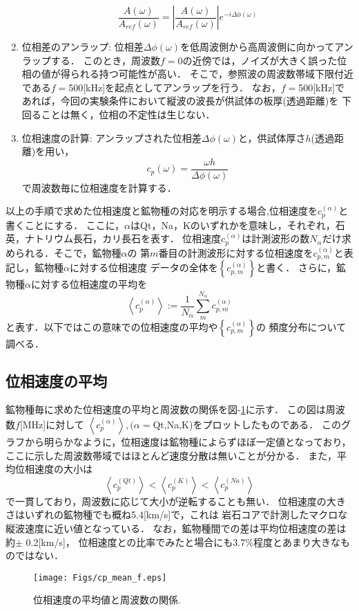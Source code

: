 \begin{enumerate}
\begin{equation}
	\frac{A(\omega)}{A_{ref}(\omega)}
	=
	\left|
	\frac{A(\omega)}{A_{ref}(\omega)}
	\right|
	e^{-i\Delta \phi(\omega)}
	\label{eqn:deconv}
\end{equation}
\item
位相差のアンラップ:
	位相差$\Delta \phi(\omega)$を低周波側から高周波側に向かってアンラップする．
	このとき，周波数$f=0$の近傍では，ノイズが大きく誤った位相の値が得られる持つ可能性が高い．
	そこで，参照波の周波数帯域下限付近である$f=$500[kHz]を起点としてアンラップを行う．
	なお，$f=$500[kHz]であれば，今回の実験条件において縦波の波長が供試体の板厚(透過距離)を
	下回ることは無く，位相の不定性は生じない．
\item
位相速度の計算:
	アンラップされた位相差$\Delta \phi(\omega)$と，供試体厚さ$h$(透過距離)を用い，
	\begin{equation}
		c_p(\omega)=\frac{\omega h}{\Delta \phi(\omega)}
		\label{eqn:cp_phi}
	\end{equation}
	で周波数毎に位相速度を計算する．
\end{enumerate}
以上の手順で求めた位相速度と鉱物種の対応を明示する場合,位相速度を$c_p^{(\alpha)}$と書くことにする．
ここに，$\alpha$はQt，Na，Kのいずれかを意味し，それぞれ，石英，ナトリウム長石，カリ長石を表す．
位相速度$c_p^{(\alpha)}$は計測波形の数$N_\alpha$だけ求められる．そこで，鉱物種$\alpha$の
第$m$番目の計測波形に対する位相速度を$c_{p,m}^{(\alpha)}$と表記し，鉱物種$\alpha$に対する位相速度
データの全体を$\left\{ c_{p,m}^{(\alpha)}\right\}$と書く．
さらに，鉱物種$\alpha$に対する位相速度の平均を
\begin{equation}
	\left< c_p^{(\alpha)}\right>:= \frac{1}{N_\alpha}\sum_{m}^{N_\alpha} c_{p,m}^{(\alpha)}
	\label{eqn:}
\end{equation}
と表す．以下ではこの意味での位相速度の平均や$\left\{ c_{p,m}^{(\alpha)}\right\}$の
頻度分布について調べる．
%
%
\subsection{位相速度の平均}
鉱物種毎に求めた位相速度の平均と周波数の関係を図-\ref{fig:fig9}に示す．
この図は周波数$f$[MHz]に対して
$\left< c_p^{(\alpha)}\right>, (\alpha=$Qt,Na,K)をプロットしたものである．
このグラフから明らかなように，位相速度は鉱物種によらずほぼ一定値となっており，
ここに示した周波数帯域ではほとんど速度分散は無いことが分かる．
また，平均位相速度の大小は
\begin{equation}
	\left< c_p^{(Qt)} \right> 
	< 
	\left< c_p^{(K)} \right> 
	< 
	\left< c_p^{(Na)}\right>
	\label{eqn:}
\end{equation}
で一貫しており，周波数に応じて大小が逆転することも無い．
位相速度の大きさはいずれの鉱物種でも概ね5.4[km/s]で，これは
岩石コアで計測したマクロな縦波速度に近い値となっている．
なお，鉱物種間での差は平均位相速度の差は約$\pm$ 0.2[km/s]，
位相速度との比率でみたと場合にも3.7$\%$程度とあまり大きなものではない．
\begin{figure}
\begin{center}
	\texttt{[image: Figs/cp\_mean\_f.eps]}
	\caption{位相速度の平均値と周波数の関係.}
	\label{fig:fig9}
\end{center}
	\vspace{-10mm}
\end{figure}
%
%
